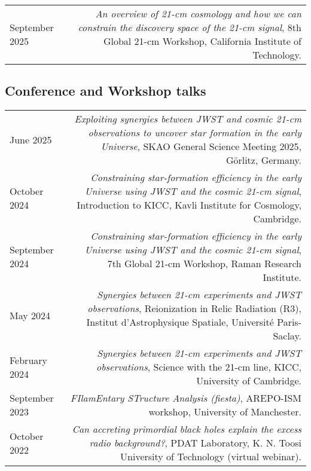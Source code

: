 \documentclass{article}
\begin{document}
\begin{longtable}{L!{\vrule}R}

    September 2025 & \textit{An overview of 21-cm cosmology and how we can constrain the discovery space of the 21-cm signal}, 8th Global 21-cm Workshop, California Institute of Technology. \\
\end{longtable}


\subsection*{Conference and Workshop talks}
\begin{longtable}{L!{\vrule}R}

    June 2025 & \textit{Exploiting synergies between JWST and cosmic 21-cm observations to uncover star formation in the early Universe}, SKAO General Science Meeting 2025, Görlitz, Germany. \\

    October 2024 & \textit{Constraining star-formation efficiency in the early Universe using JWST and the cosmic 21-cm signal}, Introduction to KICC, Kavli Institute for Cosmology, Cambridge. \\

    September 2024 & \textit{Constraining star-formation efficiency in the early Universe using JWST and the cosmic 21-cm signal}, 7th Global 21-cm Workshop, Raman Research Institute. \\

    May 2024 & \textit{Synergies between 21-cm experiments and JWST observations}, Reionization in Relic Radiation (R3), Institut d'Astrophysique Spatiale, Université Paris-Saclay. \\

    February 2024 & \textit{Synergies between 21-cm experiments and JWST observations}, Science with the 21-cm line, KICC, University of Cambridge. \\

    September 2023 & \textit{FIlamEntary STructure Analysis (fiesta)}, AREPO-ISM workshop, University of Manchester. \\

    October 2022 & \textit{Can accreting primordial black holes explain the excess radio background?}, PDAT Laboratory, K. N. Toosi University of Technology (virtual webinar). \\

\end{longtable}
\end{document}
